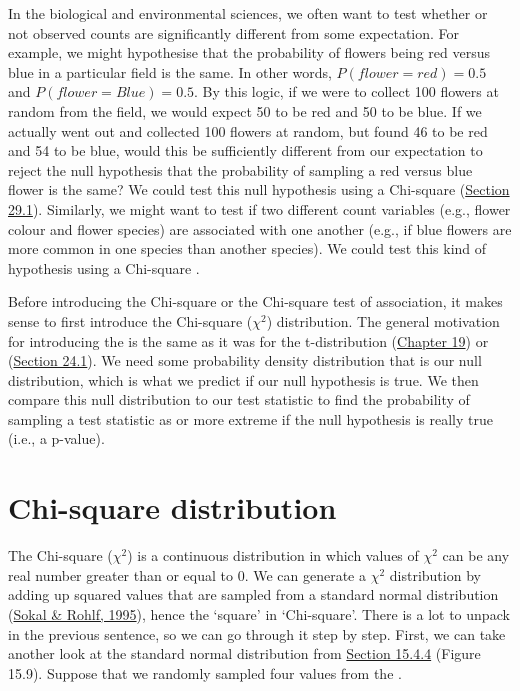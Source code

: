 \documentclass[
  openany]{krantz}
\begin{document}
In the biological and environmental sciences, we often want to test whether or not observed counts are significantly different from some expectation.
For example, we might hypothesise that the probability of flowers being red versus blue in a particular field is the same.
In other words, \(P(flower = red) = 0.5\) and \(P(flower = Blue) = 0.5\).
By this logic, if we were to collect 100 flowers at random from the field, we would expect 50 to be red and 50 to be blue.
If we actually went out and collected 100 flowers at random, but found 46 to be red and 54 to be blue, would this be sufficiently different from our expectation to reject the null hypothesis that the probability of sampling a red versus blue flower is the same?
We could test this null hypothesis using a Chi-square  (\protect\hyperlink{the-chi-square-distribution}{Section 29.1}).
Similarly, we might want to test if two different count variables (e.g., flower colour and flower species) are associated with one another (e.g., if blue flowers are more common in one species than another species).
We could test this kind of hypothesis using a Chi-square .

\newpage

Before introducing the Chi-square  or the Chi-square test of association, it makes sense to first introduce the Chi-square (\(\chi^{2}\)) distribution.
The general motivation for introducing the  is the same as it was for the t-distribution (\protect\hyperlink{Chapter_19}{Chapter 19}) or  (\protect\hyperlink{the-f-distribution}{Section 24.1}).
We need some probability density distribution that is our null distribution, which is what we predict if our null hypothesis is true.
We then compare this null distribution to our test statistic to find the probability of sampling a test statistic as or more extreme if the null hypothesis is really true (i.e., a p-value).

\hypertarget{chi-square-distribution}{%
\section{Chi-square distribution}\label{chi-square-distribution}}

The Chi-square (\(\chi^{2}\))  is a continuous distribution in which values of \(\chi^{2}\) can be any real number greater than or equal to 0. We can generate a \(\chi^{2}\) distribution by adding up squared values that are sampled from a standard normal distribution (\protect\hyperlink{ref-Sokal1995}{Sokal \& Rohlf, 1995}), hence the `square' in `Chi-square'.
There is a lot to unpack in the previous sentence, so we can go through it step by step.
First, we can take another look at the standard normal distribution from \protect\hyperlink{normal-distribution}{Section 15.4.4} (Figure 15.9).
Suppose that we randomly sampled four values from the .
\end{document}
